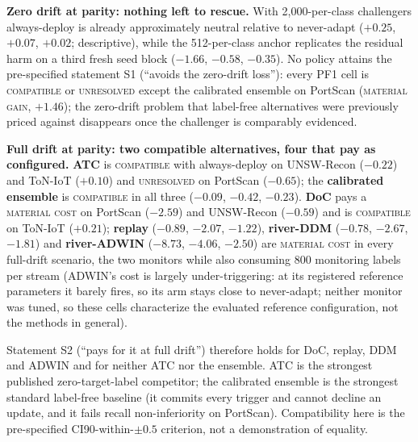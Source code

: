 \documentclass[a4paper,fleqn]{cas-sc}
\begin{document}


\textbf{Zero drift at parity: nothing left to rescue.} With 2{,}000-per-class challengers always-deploy is already approximately neutral relative to never-adapt ($+0.25$, $+0.07$, $+0.02$; descriptive), while the 512-per-class anchor replicates the residual harm on a third fresh seed block ($-1.66$, $-0.58$, $-0.35$). No policy attains the pre-specified statement S1 (``avoids the zero-drift loss''): every PF1 cell is \textsc{compatible} or \textsc{unresolved} except the calibrated ensemble on PortScan (\textsc{material gain}, $+1.46$); the zero-drift problem that label-free alternatives were previously priced against disappears once the challenger is comparably evidenced.

\textbf{Full drift at parity: two compatible alternatives, four that pay as configured.} \textbf{ATC} is \textsc{compatible} with always-deploy on UNSW-Recon ($-0.22$) and ToN-IoT ($+0.10$) and \textsc{unresolved} on PortScan ($-0.65$); the \textbf{calibrated ensemble} is \textsc{compatible} in all three ($-0.09$, $-0.42$, $-0.23$). \textbf{DoC} pays a \textsc{material cost} on PortScan ($-2.59$) and UNSW-Recon ($-0.59$) and is \textsc{compatible} on ToN-IoT ($+0.21$); \textbf{replay} ($-0.89$, $-2.07$, $-1.22$), \textbf{river-DDM} ($-0.78$, $-2.67$, $-1.81$) and \textbf{river-ADWIN} ($-8.73$, $-4.06$, $-2.50$) are \textsc{material cost} in every full-drift scenario, the two monitors while also consuming 800 monitoring labels per stream (ADWIN's cost is largely under-triggering: at its registered reference parameters it barely fires, so its arm stays close to never-adapt; neither monitor was tuned, so these cells characterize the evaluated reference configuration, not the methods in general).

Statement S2 (``pays for it at full drift'') therefore holds for DoC, replay, DDM and ADWIN and for neither ATC nor the ensemble. ATC is the strongest published zero-target-label competitor; the calibrated ensemble is the strongest standard label-free baseline (it commits every trigger and cannot decline an update, and it fails recall non-inferiority on PortScan). Compatibility here is the pre-specified CI90-within-$\pm0.5$ criterion, not a demonstration of equality.
\end{document}
